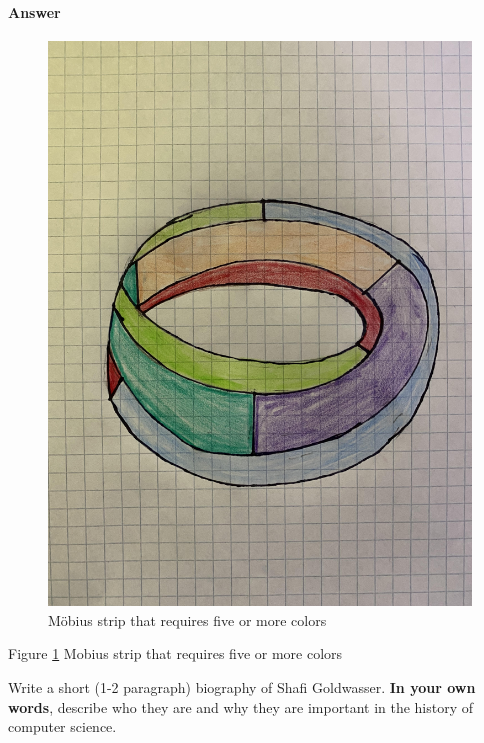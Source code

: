 \documentclass{article}
\begin{document}
\begin{enumerate}
        \paragraph{Answer}

        \begin{figure}
          \includegraphics[width=\linewidth]{six-mobius.png}
          \caption{M\"obius strip that requires five or more colors}
          \label{fig:sixmob}
        \end{figure}
Figure \ref{fig:sixmob} Mobius strip that requires five or more colors


\end{enumerate}


Write a short (1-2 paragraph) biography of Shafi Goldwasser.
\textbf{In your own words}, describe who they are and why they are important in
the history of computer science.
\end{document}
